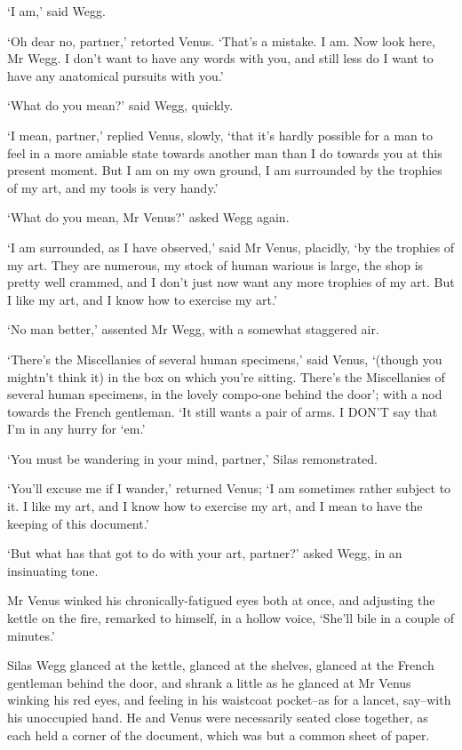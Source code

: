 ‘I am,’ said Wegg.

‘Oh dear no, partner,’ retorted Venus. ‘That’s a mistake. I am. Now look
here, Mr Wegg. I don’t want to have any words with you, and still less
do I want to have any anatomical pursuits with you.’

‘What do you mean?’ said Wegg, quickly.

‘I mean, partner,’ replied Venus, slowly, ‘that it’s hardly possible
for a man to feel in a more amiable state towards another man than I
do towards you at this present moment. But I am on my own ground, I am
surrounded by the trophies of my art, and my tools is very handy.’

‘What do you mean, Mr Venus?’ asked Wegg again.

‘I am surrounded, as I have observed,’ said Mr Venus, placidly, ‘by
the trophies of my art. They are numerous, my stock of human warious is
large, the shop is pretty well crammed, and I don’t just now want any
more trophies of my art. But I like my art, and I know how to exercise
my art.’

‘No man better,’ assented Mr Wegg, with a somewhat staggered air.

‘There’s the Miscellanies of several human specimens,’ said Venus,
‘(though you mightn’t think it) in the box on which you’re sitting.
There’s the Miscellanies of several human specimens, in the lovely
compo-one behind the door’; with a nod towards the French gentleman. ‘It
still wants a pair of arms. I DON’T say that I’m in any hurry for ‘em.’

‘You must be wandering in your mind, partner,’ Silas remonstrated.

‘You’ll excuse me if I wander,’ returned Venus; ‘I am sometimes rather
subject to it. I like my art, and I know how to exercise my art, and I
mean to have the keeping of this document.’

‘But what has that got to do with your art, partner?’ asked Wegg, in an
insinuating tone.

Mr Venus winked his chronically-fatigued eyes both at once, and
adjusting the kettle on the fire, remarked to himself, in a hollow
voice, ‘She’ll bile in a couple of minutes.’

Silas Wegg glanced at the kettle, glanced at the shelves, glanced at the
French gentleman behind the door, and shrank a little as he glanced at
Mr Venus winking his red eyes, and feeling in his waistcoat pocket--as
for a lancet, say--with his unoccupied hand. He and Venus were
necessarily seated close together, as each held a corner of the
document, which was but a common sheet of paper.

